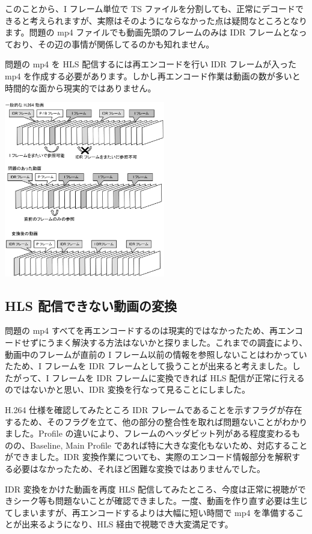  このことから、I フレーム単位で TS ファイルを分割しても、正常にデコードできると考えられますが、実際はそのようにならなかった点は疑問なところとなります。問題の mp4 ファイルでも動画先頭のフレームのみは IDR フレームとなっており、その辺の事情が関係してるのかも知れません。

 問題の mp4 を HLS 配信するには再エンコードを行い IDR フレームが入った mp4 を作成する必要があります。しかし再エンコード作業は動画の数が多いと時間的な面から現実的ではありません。

\begin{center}
\includegraphics[width=7cm]{vmatsuoka-hls/img/frame.eps}
\end{center}

\subsection{HLS 配信できない動画の変換}
 問題の mp4 すべてを再エンコードするのは現実的ではなかったため、再エンコードせずにうまく解決する方法はないかと探りました。これまでの調査により、動画中のフレームが直前の I フレーム以前の情報を参照しないことはわかっていたため、I フレームを IDR フレームとして扱うことが出来ると考えました。したがって、I フレームを IDR フレームに変換できれば HLS 配信が正常に行えるのではないかと思い、IDR 変換を行なって見ることにしました。

 H.264 仕様を確認してみたところ IDR フレームであることを示すフラグが存在するため、そのフラグを立て、他の部分の整合性を取れば問題ないことがわかりました。Profile の違いにより、フレームのヘッダビット列がある程度変わるものの、Baseline, Main Profile であれば特に大きな変化もないため、対応することができました。IDR 変換作業についても、実際のエンコード情報部分を解釈する必要はなかったため、それほど困難な変換ではありませんでした。

 IDR 変換をかけた動画を再度 HLS 配信してみたところ、今度は正常に視聴ができシーク等も問題ないことが確認できました。一度、動画を作り直す必要は生じてしまいますが、再エンコードするよりは大幅に短い時間で mp4 を準備することが出来るようになり、HLS 経由で視聴でき大変満足です。

